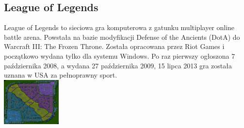 \documentclass{article}
\begin{document}
\subsection{League of Legends}
League of Legends to sieciowa gra komputerowa z gatunku multiplayer online battle arena. Powstała na bazie modyfikacji Defense of the Ancients (DotA) do Warcraft III: The Frozen Throne. Została opracowana przez Riot Games i początkowo wydana tylko dla systemu Windows. Po raz pierwszy ogłoszona 7 października 2008, a wydana 27 października 2009, 15 lipca 2013 gra została uznana w USA za pełnoprawny sport.\\
\includegraphics[width=3cm]{mapa}
\end{document}

